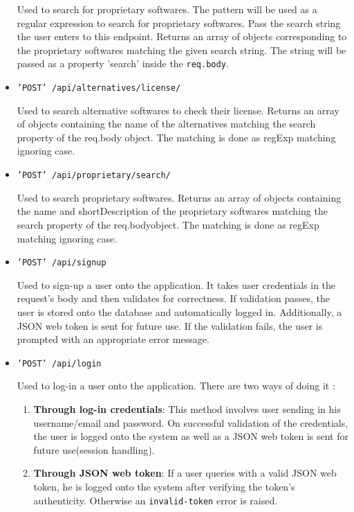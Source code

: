 \begin{itemize}
Used to search for proprietary softwares. The pattern will be used as a regular expression to search for proprietary softwares. Pass the search string the user enters to this endpoint. Returns an array of objects corresponding to the proprietary softwares matching the given search string. The string will be passed as a property 'search' inside the \texttt{req.body}.


\item{\texttt{'POST' /api/alternatives/license/}}

Used to search alternative softwares to check their license. Returns an array of objects containing the name of the alternatives matching the search property of the req.body object. The matching is done as regExp matching ignoring case.


\item{\texttt{'POST' /api/proprietary/search/}}

Used to search proprietary softwares. Returns an array of objects containing the name and shortDescription of the proprietary softwares matching the search property of the req.bodyobject. The matching is done as regExp matching ignoring case.


\item{\texttt{'POST' /api/signup}}

Used to sign-up a user onto the application. It takes user credentials in the request's body and then validates for correctness. If validation passes, the user is stored onto the database and automatically logged in. Additionally, a JSON web token is sent for future use. If the validation fails, the user is prompted with an appropriate error message.


\item{\texttt{'POST' /api/login}}

Used to log-in a user onto the application. There are two ways of doing it : 

\begin{enumerate}
\item \textbf{Through log-in credentials}: This method involves user sending in his username/email and password. On successful validation of the credentials, the user is logged onto the system as well as a JSON web token is sent for future use(session handling).

\item \textbf{Through JSON web token}: If a user queries with a valid JSON web token, he is logged onto the system after verifying the token's authenticity. Otherwise an \texttt{invalid-token} error is raised.
\end{enumerate}

\end{itemize}


